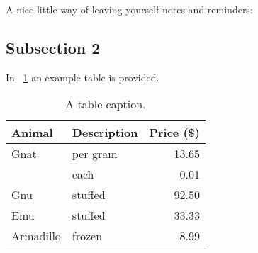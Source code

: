 A nice little way of leaving yourself notes and reminders:



\subsection{Subsection 2}
\label{sec:Subsection2}

In \tablename~\ref{tbl:aTable} an example table is provided. 

\begin{table}[htb]
\centering
\caption{A table caption.}
\label{tbl:aTable}
\vspace{.5em}
\begin{tabular}{|llr|}
	\hline
	\textbf{Animal} & \textbf{Description} & \textbf{Price (\$)} \\ \hline
	Gnat            & per gram             &               13.65 \\ \hline
	                & each                 &                0.01 \\ \hline
	Gnu             & stuffed              &               92.50 \\ \hline
	Emu             & stuffed              &               33.33 \\ \hline
	Armadillo       & frozen               &                8.99 \\ \hline
\end{tabular}
\end{table}